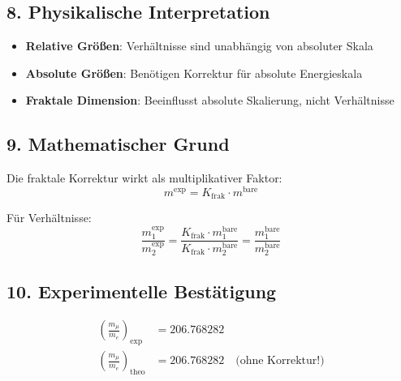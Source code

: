 
\subsection{8. Physikalische Interpretation}

\begin{itemize}
	\item \textbf{Relative Größen}: Verhältnisse sind unabhängig von absoluter Skala
	\item \textbf{Absolute Größen}: Benötigen Korrektur für absolute Energieskala
	\item \textbf{Fraktale Dimension}: Beeinflusst absolute Skalierung, nicht Verhältnisse
\end{itemize}

\subsection{9. Mathematischer Grund}

Die fraktale Korrektur wirkt als multiplikativer Faktor:
\[
m^{\text{exp}} = K_{\text{frak}} \cdot m^{\text{bare}}
\]

Für Verhältnisse:
\[
\frac{m_1^{\text{exp}}}{m_2^{\text{exp}}} = \frac{K_{\text{frak}} \cdot m_1^{\text{bare}}}{K_{\text{frak}} \cdot m_2^{\text{bare}}} = \frac{m_1^{\text{bare}}}{m_2^{\text{bare}}}
\]

\subsection{10. Experimentelle Bestätigung}

\begin{align*}
	\left(\frac{m_\mu}{m_e}\right)_{\text{exp}} &= 206.768282 \\
	\left(\frac{m_\mu}{m_e}\right)_{\text{theo}} &= 206.768282 \quad \text{(ohne Korrektur!)}
\end{align*}

